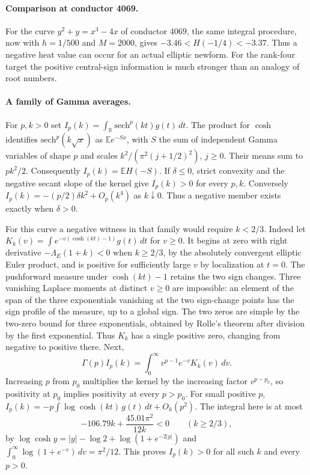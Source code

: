 \documentclass[11pt]{article}
\begin{document}
\paragraph{Comparison at conductor 4069.}
For the curve $y^2+y=x^3-4x$ of conductor $4069$, the same integral
procedure, now with $h=1/500$ and $M=2000$, gives
$-3.46<H(-1/4)<-3.37$. Thus a negative heat value can occur for an actual
elliptic newform. For the rank-four target the positive central-sign
information is much stronger than an analogy of root numbers.

\paragraph{A family of Gamma averages.}
For $p,k>0$ set $I_p(k)=\int_{\mathbb R}\mathrm{sech}^p(kt)g(t)\,dt$.
The product for $\cosh$ \cite{DLMF} identifies
$\mathrm{sech}^p(k\sqrt x)$ as $\mathbb E e^{-Sx}$, with $S$ the
sum of independent Gamma variables of shape $p$ and scales
$k^2/(\pi^2(j+1/2)^2)$, $j\ge0$. Their means sum to $pk^2/2$.
Consequently $I_p(k)=\mathbb E H(-S)$. If $\delta\le0$, strict convexity
and the negative secant slope of the kernel give $I_p(k)>0$ for every
$p,k$. Conversely $I_p(k)=-(p/2)\delta k^2+O_p(k^4)$ as $k\downarrow0$.
Thus a negative member exists exactly when $\delta>0$.

For this curve a negative witness in that family would require $k<2/3$.
Indeed let $K_k(v)=\int e^{-v(\cosh(kt)-1)}g(t)\,dt$ for $v\ge0$.
It begins at zero with right derivative $-\Lambda_E(1+k)<0$ when
$k\ge2/3$, by the absolutely convergent elliptic Euler product, and
is positive for sufficiently large $v$ by localization at $t=0$.
The pushforward measure under $\cosh(kt)-1$ retains the two sign changes.
Three vanishing Laplace moments at distinct $v\ge0$ are impossible:
an element of the span of the three exponentials vanishing at the two
sign-change points has the sign profile of the measure, up to a global
sign. The two zeros are simple by the two-zero bound for three
exponentials, obtained by Rolle's theorem after division by the first
exponential. Thus $K_k$ has a single positive zero, changing from
negative to positive there. Next,
\[
 \Gamma(p)I_p(k)=\int_0^\infty v^{p-1}e^{-v}K_k(v)\,dv.
\]
Increasing $p$ from $p_0$ multiplies the kernel by the increasing factor
$v^{p-p_0}$, so positivity at $p_0$ implies positivity at every $p>p_0$.
For small positive $p$, $I_p(k)=-p\int\log\cosh(kt)\,g(t)\,dt+O_k(p^2)$.
The integral here is at most
\[
 -106.79k+\frac{45.01\pi^2}{12k}<0\qquad(k\ge2/3),
\]
by $\log\cosh y=|y|-\log 2+\log(1+e^{-2|y|})$ and
$\int_0^\infty\log(1+e^{-v})\,dv=\pi^2/12$.
This proves $I_p(k)>0$ for all such $k$ and every $p>0$.
\end{document}

